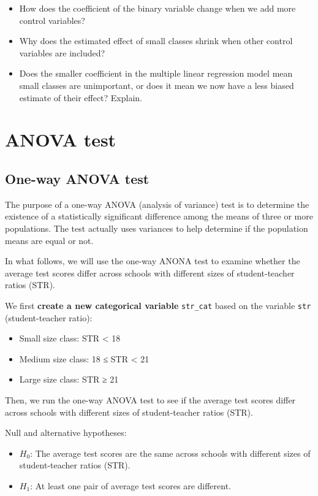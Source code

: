 \documentclass[
  12pt,
  letterpaper,
]{scrbook}
\providecommand{\tightlist}{%
  \setlength{\itemsep}{0pt}\setlength{\parskip}{0pt}}
\renewcommand{\tightlist}{\setlength{\itemsep}{0.5\baselineskip}\setlength{\parskip}{0.2\baselineskip}}
\theoremstyle{definition}
\theoremstyle{plain}
\theoremstyle{remark}
\begin{document}
\begin{itemize}
\tightlist
\item
  How does the coefficient of the binary variable change when we add
  more control variables?
\item
  Why does the estimated effect of small classes shrink when other
  control variables are included?
\item
  Does the smaller coefficient in the multiple linear regression model
  mean small classes are unimportant, or does it mean we now have a less
  biased estimate of their effect? Explain.
\end{itemize}

\section{ANOVA test}\label{anova-test}

\subsection{One-way ANOVA test}\label{one-way-anova-test}

The purpose of a one-way ANOVA (analysis of variance) test is to
determine the existence of a statistically significant difference among
the means of three or more populations. The test actually uses variances
to help determine if the population means are equal or not.

In what follows, we will use the one-way ANONA test to examine whether
the average test scores differ across schools with different sizes of
student-teacher ratios (STR).

We first \textbf{create a new categorical variable} \texttt{str\_cat}
based on the variable \texttt{str} (student-teacher ratio):

\begin{itemize}
\tightlist
\item
  Small size class: STR \textless{} 18
\item
  Medium size class: 18 ≤ STR \textless{} 21
\item
  Large size class: STR ≥ 21
\end{itemize}

Then, we run the one-way ANOVA test to see if the average test scores
differ across schools with different sizes of student-teacher ratios
(STR).

Null and alternative hypotheses:

\begin{itemize}
\tightlist
\item
  \(H_0\): The average test scores are the same across schools with
  different sizes of student-teacher ratios (STR).
\item
  \(H_1\): At least one pair of average test scores are different.
\end{itemize}
\end{document}
